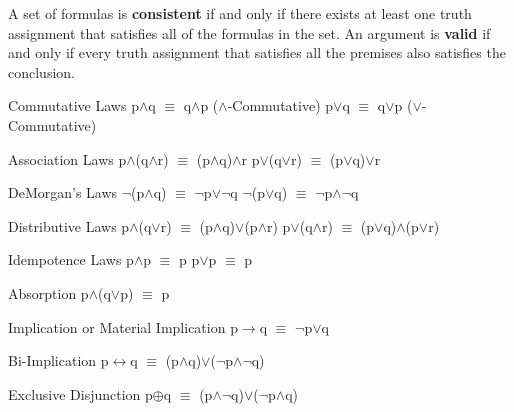 \documentclass{article}
\begin{document}
A set of formulas is \textbf{consistent} if and only if there exists at least one truth assignment that satisfies all of the formulas in the set.
An argument is \textbf{valid} if and only if every truth assignment that satisfies all the premises also satisfies the conclusion.\newline

Commutative Laws\newline
p$\wedge$q $\equiv$ q$\wedge$p ($\wedge$-Commutative)\newline
p$\lor$q $\equiv$ q$\lor$p ($\lor$-Commutative)\newline

Association Laws\newline
p$\wedge$(q$\wedge$r) $\equiv$ (p$\wedge$q)$\wedge$r\newline
p$\lor$(q$\lor$r) $\equiv$ (p$\lor$q)$\lor$r\newline

DeMorgan's Laws\newline
$\neg$(p$\wedge$q) $\equiv$ $\neg$p$\lor$$\neg$q\newline
$\neg$(p$\lor$q) $\equiv$ $\neg$p$\wedge$$\neg$q\newline

Distributive Laws\newline
p$\wedge$(q$\lor$r) $\equiv$ (p$\wedge$q)$\lor$(p$\wedge$r)\newline
p$\lor$(q$\wedge$r) $\equiv$ (p$\lor$q)$\wedge$(p$\lor$r)\newline

Idempotence Laws\newline
p$\wedge$p $\equiv$ p\newline
p$\lor$p $\equiv$ p\newline

Absorption\newline
p$\wedge$(q$\lor$p) $\equiv$ p\newline

Implication or Material Implication\newline
p$\rightarrow$q $\equiv$ $\neg$p$\lor$q\newline

Bi-Implication\newline
p$\leftrightarrow$q $\equiv$ (p$\wedge$q)$\lor$($\neg$p$\wedge$$\neg$q)\newline

Exclusive Disjunction\newline
p$\oplus$q $\equiv$ (p$\wedge$$\neg$q)$\lor$($\neg$p$\wedge$q)\newline
\end{document}
